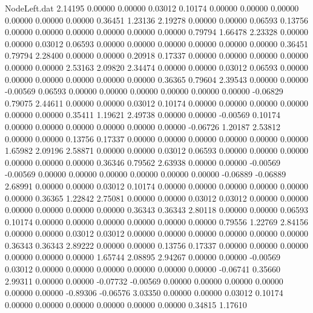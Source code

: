 \begin{filecontents}{NodeLeft.dat}
   2.14195    0.00000    0.00000     0.03012    0.10174    0.00000    0.00000    0.00000    0.00000    0.00000    0.00000    0.36451    1.23136
   2.19278    0.00000    0.00000     0.06593    0.13756    0.00000    0.00000    0.00000    0.00000    0.00000    0.00000    0.79794    1.66478
   2.23328    0.00000    0.00000     0.03012    0.06593    0.00000    0.00000    0.00000    0.00000    0.00000    0.00000    0.36451    0.79794
   2.28400    0.00000    0.00000     0.20918    0.17337    0.00000    0.00000    0.00000    0.00000    0.00000    0.00000    2.53163    2.09820
   2.34474    0.00000    0.00000     0.03012    0.06593    0.00000    0.00000    0.00000    0.00000    0.00000    0.00000    0.36365    0.79604
   2.39543    0.00000    0.00000    -0.00569    0.06593    0.00000    0.00000    0.00000    0.00000    0.00000    0.00000   -0.06829    0.79075
   2.44611    0.00000    0.00000     0.03012    0.10174    0.00000    0.00000    0.00000    0.00000    0.00000    0.00000    0.35411    1.19621
   2.49738    0.00000    0.00000    -0.00569    0.10174    0.00000    0.00000    0.00000    0.00000    0.00000    0.00000   -0.06726    1.20187
   2.53812    0.00000    0.00000     0.13756    0.17337    0.00000    0.00000    0.00000    0.00000    0.00000    0.00000    1.65982    2.09196
   2.58871    0.00000    0.00000     0.03012    0.06593    0.00000    0.00000    0.00000    0.00000    0.00000    0.00000    0.36346    0.79562
   2.63938    0.00000    0.00000    -0.00569   -0.00569    0.00000    0.00000    0.00000    0.00000    0.00000    0.00000   -0.06889   -0.06889
   2.68991    0.00000    0.00000     0.03012    0.10174    0.00000    0.00000    0.00000    0.00000    0.00000    0.00000    0.36365    1.22842
   2.75081    0.00000    0.00000     0.03012    0.03012    0.00000    0.00000    0.00000    0.00000    0.00000    0.00000    0.36343    0.36343
   2.80118    0.00000    0.00000     0.06593    0.10174    0.00000    0.00000    0.00000    0.00000    0.00000    0.00000    0.79556    1.22769
   2.84156    0.00000    0.00000     0.03012    0.03012    0.00000    0.00000    0.00000    0.00000    0.00000    0.00000    0.36343    0.36343
   2.89222    0.00000    0.00000     0.13756    0.17337    0.00000    0.00000    0.00000    0.00000    0.00000    0.00000    1.65744    2.08895
   2.94267    0.00000    0.00000    -0.00569    0.03012    0.00000    0.00000    0.00000    0.00000    0.00000    0.00000   -0.06741    0.35660
   2.99311    0.00000    0.00000    -0.07732   -0.00569    0.00000    0.00000    0.00000    0.00000    0.00000    0.00000   -0.89306   -0.06576
   3.03350    0.00000    0.00000     0.03012    0.10174    0.00000    0.00000    0.00000    0.00000    0.00000    0.00000    0.34815    1.17610

\end{filecontents}

